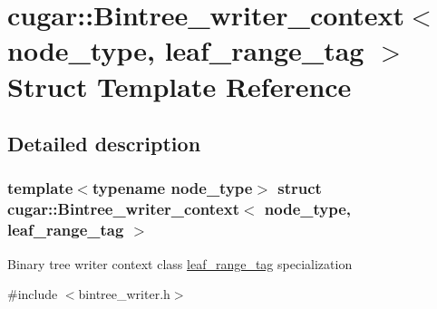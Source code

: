 \hypertarget{structcugar_1_1_bintree__writer__context_3_01node__type_00_01leaf__range__tag_01_4}{}\section{cugar\+:\+:Bintree\+\_\+writer\+\_\+context$<$ node\+\_\+type, leaf\+\_\+range\+\_\+tag $>$ Struct Template Reference}
\label{structcugar_1_1_bintree__writer__context_3_01node__type_00_01leaf__range__tag_01_4}


\subsection{Detailed description}
\subsubsection*{template$<$typename node\+\_\+type$>$\newline
struct cugar\+::\+Bintree\+\_\+writer\+\_\+context$<$ node\+\_\+type, leaf\+\_\+range\+\_\+tag $>$}

Binary tree writer context class \hyperlink{structcugar_1_1leaf__range__tag}{leaf\+\_\+range\+\_\+tag} specialization 

{\ttfamily \#include $<$bintree\+\_\+writer.\+h$>$}


